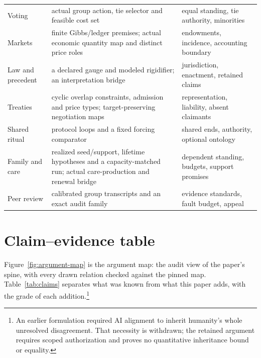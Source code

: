 \documentclass[pdflatex,sn-basic]{sn-jnl}%
\newcommand{\slot}[1]{}%
\begin{document}
\begin{appendices}
\begin{table}[!htbp]
\begin{tabularx}{\textwidth}{@{}>{\raggedright\arraybackslash}p{2.6cm}>{\raggedright\arraybackslash}X>{\raggedright\arraybackslash}p{3.6cm}@{}}
    Voting & actual group action, tie selector and feasible cost set & equal standing, tie authority, minorities\\
    Markets & finite Gibbs/ledger premises; actual economic quantity map and distinct price roles & endowments, incidence, accounting boundary\\
    Law and precedent & a declared gauge and modeled rigidifier; an interpretation bridge & jurisdiction, enactment, retained claims\\
    Treaties & cyclic overlap constraints, admission and price types; target-preserving negotiation maps & representation, liability, absent claimants\\
    Shared ritual & protocol loops and a fixed forcing comparator & shared ends, authority, optional ontology\\
    Family and care & realized seed/support, lifetime hypotheses and a capacity-matched run; actual care-production and renewal bridge & dependent standing, budgets, support promises\\
    Peer review & calibrated group transcripts and an exact audit family & evidence standards, fault budget, appeal\\
    \bottomrule
  \end{tabularx}
\end{table}

\FloatBarrier%
\section{Claim--evidence table}\label{app:claims}

\slot{E}
Figure~\ref{fig:argument-map} is the argument map: the audit view of the paper's spine, with every drawn relation checked against the pinned map. Table~\ref{tab:claims} separates what was known from what this paper adds, with the grade of each addition.\footnote{An earlier formulation required AI alignment to inherit humanity's whole unresolved disagreement. That necessity is withdrawn; the retained argument requires scoped authorization and proves no quantitative inheritance bound or equality.}


\end{appendices}
\end{document}
